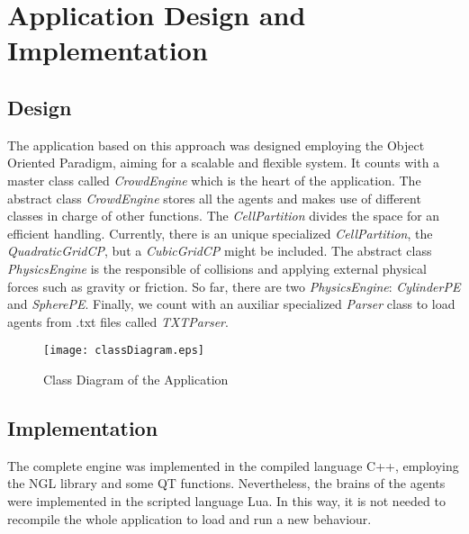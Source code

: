 \ifx\isEmbedded\undefined

\graphicspath{{../img/}}

\fi

\chapter{Application Design and Implementation}
\label{chap:application_design_implementation}

\section{Design}

The application based on this approach was designed employing the Object Oriented Paradigm, aiming for a scalable and flexible system. It counts with a master class called \emph{CrowdEngine} which is the heart of the application. The abstract class \emph{CrowdEngine} stores all the agents and makes use of different classes in charge of other functions. The \emph{CellPartition} divides the space for an efficient handling. Currently, there is an unique specialized \emph{CellPartition}, the \emph{QuadraticGridCP}, but a \emph{CubicGridCP} might be included. The abstract class \emph{PhysicsEngine} is the responsible of collisions and applying external physical forces such as gravity or friction. So far, there are two \emph{PhysicsEngine}: \emph{CylinderPE} and \emph{SpherePE}. Finally, we count with an auxiliar specialized \emph{Parser} class to load agents from .txt files called \emph{TXTParser}.

\begin{landscape}

\begin{figure}[!htb]
  \centering
  \texttt{[image: classDiagram.eps]}
  \caption{Class Diagram of the Application}
  \label{fig:classDiag}
\end{figure}

\end{landscape}

\section{Implementation}
The complete engine was implemented in the compiled language C++, employing the NGL library and some QT functions. Nevertheless, the brains of the agents were implemented in the scripted language Lua. In this way, it is not needed to recompile the whole application to load and run a new behaviour.

